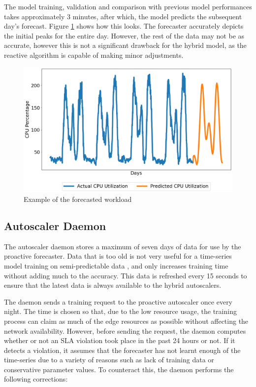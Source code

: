 The model training, validation and comparison with previous model performances takes approximately 3 minutes, after which, the model predicts the subsequent day's forecast. Figure \ref{fig:lstm-final-data} shows how this looks. The forecaster accurately depicts the initial peaks for the entire day. However, the rest of the data may not be as accurate, however this is not a significant drawback for the hybrid model, as the reactive algorithm is capable of making minor adjustments.

\begin{figure}[htb]
    \centering
    \caption{Example of the forecasted workload}
    \label{fig:lstm-final-data}
    \includegraphics[width=1.0\linewidth]{Figures/LSTM-Final-Data.png}
\end{figure}

\subsection{Autoscaler Daemon}
\label{subsec:ch4-auto-daemon-subsection}

The autoscaler daemon stores a maximum of seven days of data for use by the proactive forecaster. Data that is too old is not very useful for a time-series model training on semi-predictable data \cite{greff2016lstm}, and only increases training time without adding much to the accuracy. This data is refreshed every 15 seconds to ensure that the latest data is always available to the hybrid autoscalers.\par

The daemon sends a training request to the proactive autoscaler once every night. The time is chosen so that, due to the low resource usage, the training process can claim as much of the edge resources as possible without affecting the network availability. However, before sending the request, the daemon computes whether or not an SLA violation took place in the past 24 hours or not. If it detects a violation, it assumes that the forecaster has not learnt enough of the time-series due to a variety of reasons such as lack of training data or conservative parameter values. To counteract this, the daemon performs the following corrections:

